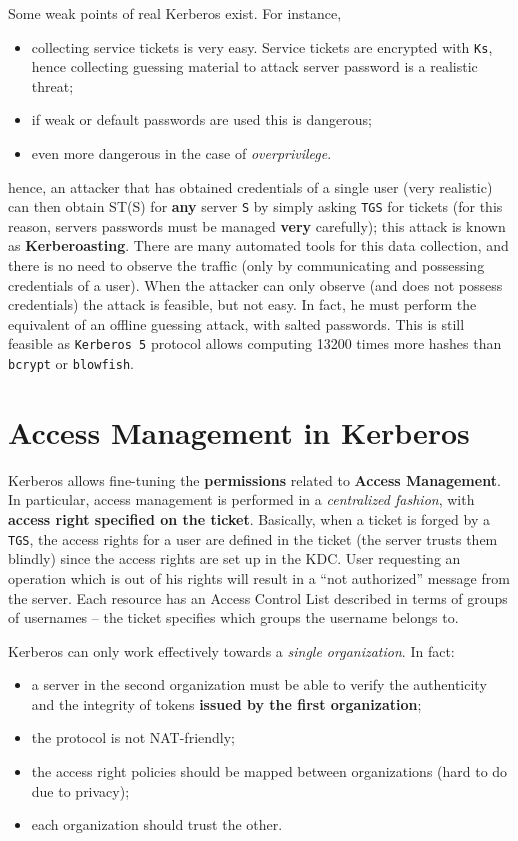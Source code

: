 \documentclass[10pt]{extbook}
\begin{document}
Some weak points of real Kerberos exist. For instance,
\begin{itemize}
    \item collecting service tickets is very easy. Service tickets are
        encrypted with \texttt{Ks}, hence collecting guessing material to
        attack server password is a realistic threat;
    \item if weak or default passwords are used this is dangerous;
    \item even more dangerous in the case of \emph{overprivilege}.
\end{itemize}
hence, an attacker that has obtained credentials of a single user (very
realistic) can then obtain ST(S) for \textbf{any} server \texttt{S} by simply
asking \texttt{TGS} for tickets (for this reason, servers passwords must be
managed \textbf{very} carefully); this attack is known as
\textbf{Kerberoasting}. There are many automated tools for this data
collection, and there is no need to observe the traffic (only by communicating
and possessing credentials of a user). When the attacker can only observe (and
does not possess credentials) the attack is feasible, but not easy. In fact, he
must perform the equivalent of an offline guessing attack, with salted
passwords. This is still feasible as \texttt{Kerberos 5} protocol allows
computing 13200 times more hashes than \texttt{bcrypt} or \texttt{blowfish}.

\section{Access Management in Kerberos}

Kerberos allows fine\--tuning the \textbf{permissions} related to
\textbf{Access Management}. In particular, access management is performed in a
\emph{centralized fashion}, with \textbf{access right specified on the ticket}.
Basically, when a ticket is forged by a \texttt{TGS}, the access rights for a
user are defined in the ticket (the server trusts them blindly) since the
access rights are set up in the KDC. User requesting an operation which is out
of his rights will result in a ``not authorized'' message from the server. Each
resource has an Access Control List described in terms of groups of usernames
-- the ticket specifies which groups the username belongs to.

Kerberos can only work effectively towards a \emph{single organization}. In fact:
\begin{itemize}
    \item a server in the second organization must be able to verify the
        authenticity and the integrity of tokens \textbf{issued by the first
        organization};
    \item the protocol is not NAT\--friendly;
    \item the access right policies should be mapped between organizations
        (hard to do due to privacy);
    \item each organization should trust the other.
\end{itemize}
\end{document}
